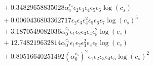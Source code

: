 \documentclass[10pt]{article}
\begin{document}
\begin{align*}
&{}  + 0.34829658835028 \alpha_{1}^{c_s} \epsilon_{2} \epsilon_{3} \epsilon_{4} \epsilon_{5} \epsilon_{6} \log{\left(c_{s} \right)} \\
&{}  + 0.0060436803362717 \epsilon_{2} \epsilon_{3} \epsilon_{4}^{2} \epsilon_{5} \epsilon_{6} \epsilon_{7} \log{\left(c_{s} \right)}^{5} \\
&{}  + 3.1870549082036 \alpha_{0}^{c_s} \epsilon_{1} \epsilon_{2} \epsilon_{3} \epsilon_{4} \epsilon_{5}^{2} \log{\left(c_{s} \right)} \\
&{}  + 12.748219632814 \alpha_{0}^{c_s} \epsilon_{1} \epsilon_{2} \epsilon_{3}^{2} \epsilon_{4} \epsilon_{5} \log{\left(c_{s} \right)} \\
&{}  + 0.80516640251492 \left(\alpha_{0}^{c_s}\right)^{2} \epsilon_{1} \epsilon_{2} \epsilon_{3} \epsilon_{4} \epsilon_{5} \log{\left(c_{s} \right)}^{2}
\end{align*}
\end{document}
